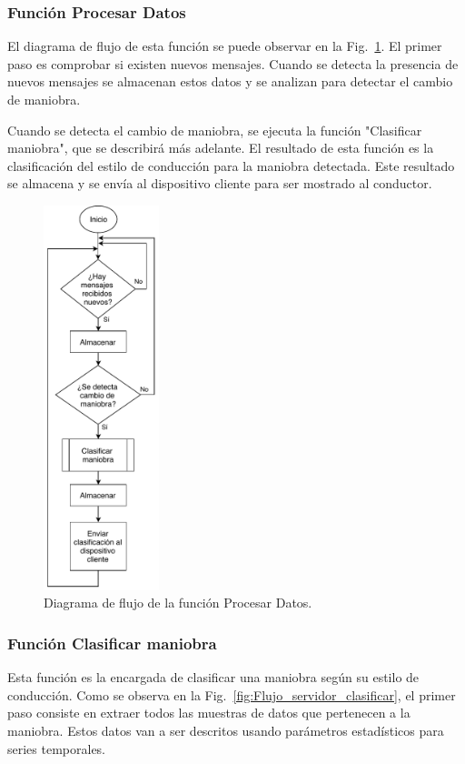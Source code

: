 \subsubsection{Función Procesar Datos}
El diagrama de flujo de esta función se puede observar en la Fig.~\ref{fig:Flujo_servidor_procesar}. El primer paso es comprobar si existen nuevos mensajes. Cuando se detecta la presencia de nuevos mensajes se almacenan estos datos y se analizan para detectar el cambio de maniobra.

Cuando se detecta el cambio de maniobra, se ejecuta la función "Clasificar maniobra", que se describirá más adelante. El resultado de esta función es la clasificación del estilo de conducción para la maniobra detectada. Este resultado se almacena y se envía al dispositivo cliente para ser mostrado al conductor.

\begin{figure}[bth!]
\centering
\includegraphics[width=0.3\textwidth]{Flujo_servidor_procesar.pdf}
\caption{Diagrama de flujo de la función Procesar Datos.}
\label{fig:Flujo_servidor_procesar}
\end{figure}

\subsubsection{Función Clasificar maniobra}
Esta función es la encargada de clasificar una maniobra según su estilo de conducción. Como se observa en la Fig.~\ref{fig:Flujo_servidor_clasificar}, el primer paso consiste en extraer todos las muestras de datos que pertenecen a la maniobra. Estos datos van a ser descritos usando parámetros estadísticos para series temporales.

